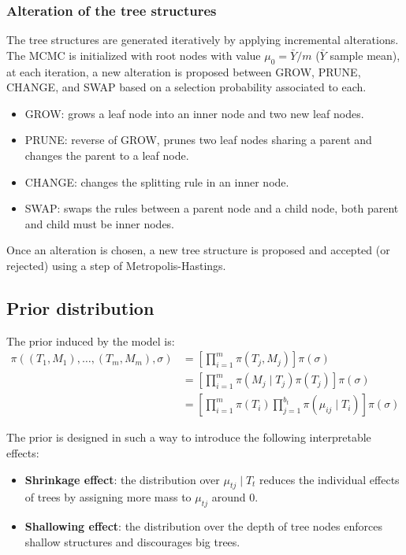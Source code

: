 \documentclass[11pt,a4paper]{article}
\begin{document}
\subsubsection{Alteration of the tree structures}
The tree structures are generated iteratively by applying incremental alterations. The MCMC is initialized with root nodes with value $\mu_0 = \bar{Y}/m$ ($\bar{Y}$ sample mean), at each iteration, a new alteration is proposed between GROW, PRUNE, CHANGE, and SWAP based on a selection probability associated to each.
\begin{itemize}
    \item GROW: grows a leaf node into an inner node and two new leaf nodes.
    \item PRUNE: reverse of GROW, prunes two leaf nodes sharing a parent and changes the parent to a leaf node.
    \item CHANGE: changes the splitting rule in an inner node.
    \item SWAP: swaps the rules between a parent node and a child node, both parent and child must be inner nodes.
\end{itemize}
Once an alteration is chosen, a new tree structure is proposed and accepted (or rejected) using a step of Metropolis-Hastings.

\subsection{Prior distribution}
The prior induced by the model is:
\begin{equation}
    \begin{split}
        \pi((T_1, M_1), \dots, (T_m, M_m), \sigma) & = \left[\prod_{i = 1}^m \pi(T_j, M_j) \right] \pi(\sigma)                                  \\
                                                   & = \left[\prod_{i = 1}^m \pi(M_j \mid T_j) \pi(T_j) \right] \pi(\sigma)                     \\
                                                   & = \left[\prod_{i=1}^m \pi(T_i) \prod_{j=1}^{b_t}\pi(\mu_{ij} \mid T_i) \right] \pi(\sigma)
    \end{split}
\end{equation}

The prior is designed in such a way to introduce the following interpretable effects:
\begin{itemize}
    \item \textbf{Shrinkage effect}: the distribution over $\mu_{tj} \mid T_t$ reduces the individual effects of trees by assigning more mass to $\mu_{tj}$ around $0$.
    \item \textbf{Shallowing effect}: the distribution over the depth of tree nodes enforces shallow structures and discourages big trees.
\end{itemize}
\end{document}
